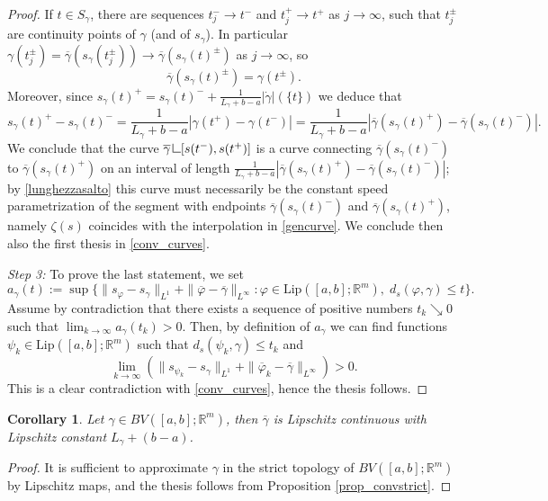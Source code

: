\documentclass[a4paper,11pt]{article}
\numberwithin{equation}{section}
\newtheorem{cor}[theorem]{Corollary}
\newcommand{\R}{\mathbb{R}}
\newcommand{\res}      {\mathop{\hbox{\vrule height 7pt width .5pt depth
                        0pt\vrule height .5pt width 6pt depth 0pt}}\nolimits}
\begin{document}
\begin{proof}
 
	If $t\in S_\gamma$, there are sequences $t^-_j\rightarrow t^-$ and $t^+_j\rightarrow t^+$ as $j\rightarrow \infty$, such that $t^\pm_j$ are continuity points of $\gamma$ (and of $s_\gamma$). In particular 
	$\gamma(t^\pm_j)=\overline \gamma(s_\gamma(t^\pm_j))\rightarrow \overline \gamma(s_\gamma(t)^\pm)$ as $j\rightarrow \infty$,  so 
	$$\overline \gamma(s_\gamma(t)^\pm)=\gamma(t^\pm).$$ Moreover, since $s_\gamma(t)^+= s_\gamma(t)^-+\frac{1}{L_\gamma+b-a}|\dot\gamma|(\{t\})$ we deduce that $$s_\gamma(t)^+- s_\gamma(t)^-=\frac{1}{L_\gamma+b-a}|\gamma(t^+)-\gamma(t^-)|=\frac{1}{L_\gamma+b-a}|\overline \gamma( s_\gamma(t)^+)-\overline \gamma( s_\gamma(t)^-)|.$$
	We conclude that the curve $\overline \gamma\res[s(t^-),s(t^+)]$ is a curve connecting $\overline \gamma( s_\gamma(t)^-)$ to $\overline \gamma( s_\gamma(t)^+)$ on an interval of length $\frac{1}{L_\gamma+b-a}|\overline \gamma(s_\gamma(t)^+)-\overline \gamma( s_\gamma(t)^-)|$; by  \eqref{lunghezzasalto} this curve must necessarily be the constant speed parametrization of the segment with endpoints $\overline \gamma(s_\gamma(t)^-)$ and $\overline \gamma(s_\gamma(t)^+)$, namely $\zeta(s)$ coincides with the interpolation in \eqref{gencurve}. We conclude then also the first thesis in \eqref{conv_curves}.

\textit{Step 3:} To prove the last statement, we set 
$$a_\gamma(t):=\sup\{\|s_\varphi-s_\gamma\|_{L^1}+\|\overline \varphi-\overline \gamma\|_{L^\infty}:\varphi\in \textrm{Lip}([a,b];\R^m),\;d_s(\varphi,\gamma)\leq t\}.$$
Assume by contradiction that there exists a sequence of positive numbers $t_k\searrow0$ such that $\lim_{k\rightarrow \infty}a_\gamma(t_k)>0.$ Then, by definition of $a_\gamma$ we can find functions $\psi_k\in \textrm{Lip}([a,b];\R^m)$ such that $d_s(\psi_k,\gamma)\leq t_k$ and $$ \lim_{k\rightarrow \infty}(\|s_{\psi_k}-s_\gamma\|_{L^1}+\|\overline {\varphi}_k-\overline \gamma\|_{L^\infty})>0.$$
This is a clear contradiction with \eqref{conv_curves}, hence the thesis follows. 
\end{proof}
\begin{cor}\label{cor_varbar}
Let $\gamma\in BV([a,b];\R^m)$, then $\overline \gamma$ is Lipschitz continuous with Lipschitz constant $L_\gamma+(b-a)$.
\end{cor}
\begin{proof}
It is sufficient to approximate $\gamma$ in the strict topology of $BV([a,b];\R^m)$ by Lipschitz maps, and the thesis follows from Proposition \ref{prop_convstrict}.
\end{proof}
%
\end{document}
